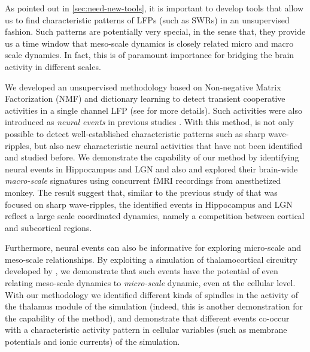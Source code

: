 As pointed out in \autoref{sec:need-new-tools}, 
it is important to develop tools that allow us to find characteristic patterns of LFPs (such as SWRs) in an unsupervised fashion.
Such patterns are potentially very special, in the sense that,
they provide us a time window that meso-scale dynamics is closely related micro and macro scale dynamics.
In fact, this is of paramount importance for bridging the brain activity in different scales.

We developed an unsupervised methodology based on Non-negative Matrix Factorization (NMF) and dictionary learning to detect transient cooperative activities in a single channel LFP
(see  for more details).
Such activities were also introduced as \emph{neural events} in previous studies \cite{logothetisHippocampalCorticalInteraction2012,logothetisNeuralEventTriggeredFMRILargescale2014,ramirez-villegasDiversitySharpwaverippleLFP2015}.
With this method, is not only possible to detect well-established characteristic patterns such as sharp wave-ripples,
but also new characteristic neural activities that have not been identified and studied before.
We demonstrate the capability of our method by identifying neural events in Hippocampus and LGN and also and explored their brain-wide \emph{macro-scale} signatures using concurrent fMRI recordings from anesthetized monkey.
The result suggest that, similar to the previous study of \citet{logothetisHippocampalCorticalInteraction2012} that was focused on sharp wave-ripples,
the identified events in Hippocampus and LGN reflect a large scale coordinated dynamics,
namely a competition between cortical and subcortical regions.

Furthermore, neural events can also be informative for exploring micro-scale and meso-scale relationships.
By exploiting a simulation of thalamocortical circuitry  developed by \citet{costaThalamocorticalNeuralMass2016},
we demonstrate that such events have the potential of even relating meso-scale dynamics to \emph{micro-scale} dynamic, even at the cellular level.
With our methodology we identified different kinds of spindles in the activity of the thalamus module of the simulation (indeed, this is another demonstration for the capability of the method),
and demonstrate that different events co-occur with a characteristic activity pattern in cellular variables (such as membrane potentials and ionic currents) of the simulation.

